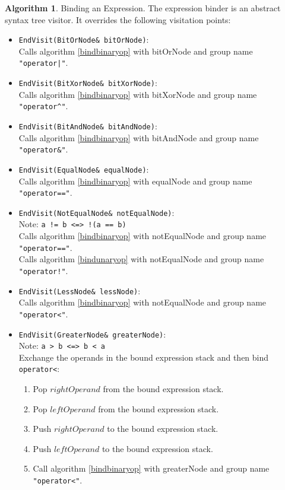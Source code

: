 \documentclass[a4paper,oneside,11pt]{book}
\theoremstyle{definition}
\newtheorem{algo}{Algorithm}[section]
\begin{document}
\begin{algo} Binding an Expression.
The expression binder is an abstract syntax tree visitor.
It overrides the following visitation points:
\begin{itemize}
\item
\verb|EndVisit(BitOrNode& bitOrNode)|:\\
Calls algorithm \ref{bindbinaryop} with bitOrNode and group name \verb+"operator|"+.
\item
\verb|EndVisit(BitXorNode& bitXorNode)|:\\
Calls algorithm \ref{bindbinaryop} with bitXorNode and group name \verb|"operator^"|.
\item
\verb|EndVisit(BitAndNode& bitAndNode)|:\\
Calls algorithm \ref{bindbinaryop} with bitAndNode and group name \verb|"operator&"|.
\item
\verb|EndVisit(EqualNode& equalNode)|:\\
Calls algorithm \ref{bindbinaryop} with equalNode and group name \verb|"operator=="|.
\item
\verb|EndVisit(NotEqualNode& notEqualNode)|:\\
Note: \verb|a != b <=> !(a == b)|\\
Calls algorithm \ref{bindbinaryop} with notEqualNode and group name \verb|"operator=="|.\\
Calls algorithm \ref{bindunaryop} with notEqualNode and group name \verb|"operator!"|.\\
\item
\verb|EndVisit(LessNode& lessNode)|:\\
Calls algorithm \ref{bindbinaryop} with notEqualNode and group name \verb|"operator<"|.\\
\item
\verb|EndVisit(GreaterNode& greaterNode)|:\\
Note: \verb|a > b <=> b < a|\\
Exchange the operands in the bound expression stack and then bind \verb|operator<|:
\begin{enumerate}
\item
Pop $rightOperand$ from the bound expression stack.
\item
Pop $leftOperand$ from the bound expression stack.
\item
Push $rightOperand$ to the bound expression stack.
\item
Push $leftOperand$ to the bound expression stack.
\item
Call algorithm \ref{bindbinaryop} with greaterNode and group name \verb|"operator<"|.

\end{enumerate}
\end{itemize}
\end{algo}
\end{document}

